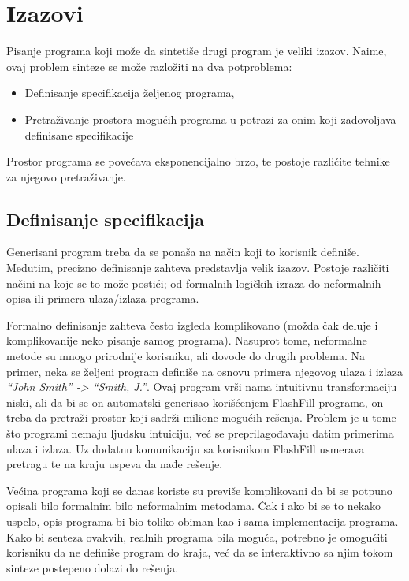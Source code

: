 \section{Izazovi}
\label{sec:Izazovi}

Pisanje programa koji može da sintetiše drugi program je veliki izazov. Naime, ovaj problem sinteze se može razložiti na dva potproblema:

\begin{itemize}
  \item Definisanje specifikacija željenog programa,
  \item Pretraživanje prostora mogućih programa u potrazi za onim koji zadovoljava definisane specifikacije
\end{itemize}

Prostor programa se povećava eksponencijalno brzo, te postoje različite tehnike za njegovo pretraživanje.


\subsection{Definisanje specifikacija}
\label{subsec:DefinisanjeSpecifikacija}

Generisani program treba da se ponaša na način koji to korisnik definiše. Međutim, precizno definisanje zahteva predstavlja velik izazov. Postoje različiti načini na koje se to može postići; od formalnih logičkih izraza do neformalnih opisa ili primera ulaza/izlaza programa.

Formalno definisanje zahteva često izgleda komplikovano (možda čak deluje i komplikovanije neko pisanje samog programa). Nasuprot tome, neformalne metode su mnogo prirodnije korisniku, ali dovode do drugih problema. Na primer, neka se željeni program definiše na osnovu primera njegovog ulaza i izlaza \emph{“John Smith” -> “Smith, J.”}. Ovaj program vrši nama intuitivnu transformaciju niski, ali da bi se on automatski generisao korišćenjem FlashFill \cite{FlashFill} programa, on treba da pretraži prostor koji sadrži milione mogućih rešenja. Problem je u tome što programi nemaju ljudsku intuiciju, već se preprilagođavaju datim primerima ulaza i izlaza. Uz dodatnu komunikaciju sa korisnikom FlashFill usmerava pretragu te na kraju uspeva da nađe rešenje.

Većina programa koji se danas koriste su previše komplikovani da bi se potpuno opisali bilo formalnim bilo neformalnim metodama. Čak i ako bi se to nekako uspelo, opis programa bi bio toliko obiman kao i sama implementacija programa. Kako bi senteza ovakvih, realnih programa bila moguća, potrebno je omogućiti korisniku da ne definiše program do kraja, već da se interaktivno sa njim tokom sinteze postepeno dolazi do rešenja.


